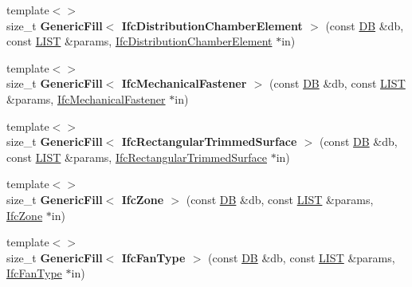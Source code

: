 \begin{DoxyCompactItemize}
\item 
\hypertarget{namespace_assimp_1_1_s_t_e_p_a1357f0609a57910499e3ba3f21d198f8}{{\footnotesize template$<$$>$ }\\size\+\_\+t {\bfseries Generic\+Fill$<$ Ifc\+Distribution\+Chamber\+Element $>$} (const \hyperlink{class_assimp_1_1_s_t_e_p_1_1_d_b}{D\+B} \&db, const \hyperlink{class_assimp_1_1_s_t_e_p_1_1_e_x_p_r_e_s_s_1_1_l_i_s_t}{L\+I\+S\+T} \&params, \hyperlink{struct_assimp_1_1_i_f_c_1_1_ifc_distribution_chamber_element}{Ifc\+Distribution\+Chamber\+Element} $\ast$in)}\label{namespace_assimp_1_1_s_t_e_p_a1357f0609a57910499e3ba3f21d198f8}

\item 
\hypertarget{namespace_assimp_1_1_s_t_e_p_aa155a38d24bb3edee2a4cf972b058a6d}{{\footnotesize template$<$$>$ }\\size\+\_\+t {\bfseries Generic\+Fill$<$ Ifc\+Mechanical\+Fastener $>$} (const \hyperlink{class_assimp_1_1_s_t_e_p_1_1_d_b}{D\+B} \&db, const \hyperlink{class_assimp_1_1_s_t_e_p_1_1_e_x_p_r_e_s_s_1_1_l_i_s_t}{L\+I\+S\+T} \&params, \hyperlink{struct_assimp_1_1_i_f_c_1_1_ifc_mechanical_fastener}{Ifc\+Mechanical\+Fastener} $\ast$in)}\label{namespace_assimp_1_1_s_t_e_p_aa155a38d24bb3edee2a4cf972b058a6d}

\item 
\hypertarget{namespace_assimp_1_1_s_t_e_p_a9fd708ad327227f614a4ea836e25bd8b}{{\footnotesize template$<$$>$ }\\size\+\_\+t {\bfseries Generic\+Fill$<$ Ifc\+Rectangular\+Trimmed\+Surface $>$} (const \hyperlink{class_assimp_1_1_s_t_e_p_1_1_d_b}{D\+B} \&db, const \hyperlink{class_assimp_1_1_s_t_e_p_1_1_e_x_p_r_e_s_s_1_1_l_i_s_t}{L\+I\+S\+T} \&params, \hyperlink{struct_assimp_1_1_i_f_c_1_1_ifc_rectangular_trimmed_surface}{Ifc\+Rectangular\+Trimmed\+Surface} $\ast$in)}\label{namespace_assimp_1_1_s_t_e_p_a9fd708ad327227f614a4ea836e25bd8b}

\item 
\hypertarget{namespace_assimp_1_1_s_t_e_p_a8a4435f6743e3069a0416b28d3267c01}{{\footnotesize template$<$$>$ }\\size\+\_\+t {\bfseries Generic\+Fill$<$ Ifc\+Zone $>$} (const \hyperlink{class_assimp_1_1_s_t_e_p_1_1_d_b}{D\+B} \&db, const \hyperlink{class_assimp_1_1_s_t_e_p_1_1_e_x_p_r_e_s_s_1_1_l_i_s_t}{L\+I\+S\+T} \&params, \hyperlink{struct_assimp_1_1_i_f_c_1_1_ifc_zone}{Ifc\+Zone} $\ast$in)}\label{namespace_assimp_1_1_s_t_e_p_a8a4435f6743e3069a0416b28d3267c01}

\item 
\hypertarget{namespace_assimp_1_1_s_t_e_p_ad6d087a89fee2a00e3816ad257b5ef30}{{\footnotesize template$<$$>$ }\\size\+\_\+t {\bfseries Generic\+Fill$<$ Ifc\+Fan\+Type $>$} (const \hyperlink{class_assimp_1_1_s_t_e_p_1_1_d_b}{D\+B} \&db, const \hyperlink{class_assimp_1_1_s_t_e_p_1_1_e_x_p_r_e_s_s_1_1_l_i_s_t}{L\+I\+S\+T} \&params, \hyperlink{struct_assimp_1_1_i_f_c_1_1_ifc_fan_type}{Ifc\+Fan\+Type} $\ast$in)}\label{namespace_assimp_1_1_s_t_e_p_ad6d087a89fee2a00e3816ad257b5ef30}


\end{DoxyCompactItemize}
